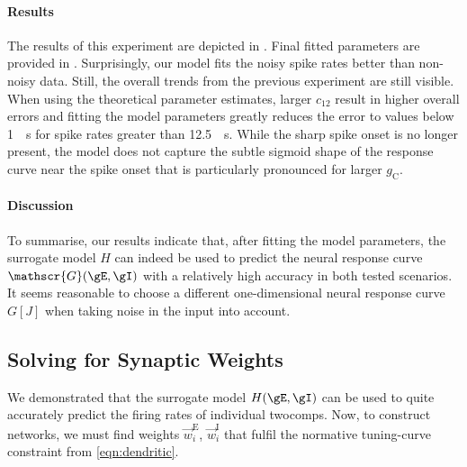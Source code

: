 \paragraph{Results}
The results of this experiment are depicted in .
Final fitted parameters are provided in .
Surprisingly, our model fits the noisy spike rates better than non-noisy data.
Still, the overall trends from the previous experiment are still visible.
When using the theoretical parameter estimates, larger $c_{12}$ result in higher overall errors and fitting the model parameters greatly reduces the error to values below \SI{1}{\per\second} for spike rates greater than \SI{12.5}{\per\second}.
While the sharp spike onset is no longer present, the model does not capture the subtle sigmoid shape of the response curve near the spike onset that is particularly pronounced for larger $g_\mathrm{C}$.

\paragraph{Discussion}
To summarise, our results indicate that, after fitting the model parameters, the surrogate model $H$ can indeed be used to predict the neural response curve $\mathscr{G}(\gE, \gI)$ with a relatively high accuracy in both tested scenarios.
It seems reasonable to choose a different one-dimensional neural response curve $G[J]$ when taking noise in the input into account.


\subsection{Solving for Synaptic Weights}
\label{sec:two_comp_synaptic_weights}

We demonstrated that the surrogate model $H(\gE, \gI)$ can be used to quite accurately predict the firing rates of individual \glspl{twocomp}.
Now, to construct \NEF networks, we must find weights $\vec w^\mathrm{E}_i$, $\vec w^\mathrm{I}_i$ that fulfil the normative tuning-curve constraint from \cref{eqn:dendritic}.

